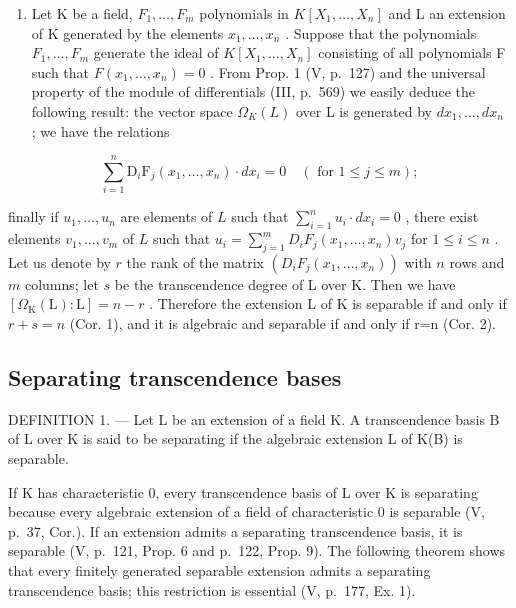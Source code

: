\begin{enumerate}
\def\labelenumi{\arabic{enumi})}
\setcounter{enumi}{1}
\tightlist
\item
  Let K be a field, \(F_{1}, \ldots, F_{m}\) polynomials in \(K[X_{1}, \ldots, X_{n}]\) and L an extension of K generated by the elements \(x_{1}, \ldots, x_{n}\) . Suppose that the polynomials \(F_{1}, \ldots, F_{m}\) generate the ideal of \(K[X_{1}, \ldots, X_{n}]\) consisting of all polynomials F such that \(F(x_{1}, \ldots, x_{n}) = 0\) . From Prop. 1 (V, p.~127) and the universal property of the module of differentials (III, p.~569) we easily deduce the following result: the vector space \(\Omega_{K}(L)\) over L is generated by \(dx_{1}, \ldots, dx_{n}\) ; we have the relations
\end{enumerate}

\[
\sum_ {i = 1} ^ {n} \mathrm{D} _ {i} \mathrm{F} _ {j} (x _ {1}, \dots , x _ {n}) \cdot d x _ {i} = 0 \quad (\text { for } 1 \leqslant j \leqslant m);\tag{6}
\]

finally if \(u_1, \ldots, u_n\) are elements of \(L\) such that \(\sum_{i=1}^{n} u_i \cdot dx_i = 0\) , there exist elements \(v_1, \ldots, v_m\) of \(L\) such that \(u_i = \sum_{j=1}^{m} D_i F_j(x_1, \ldots, x_n) v_j\) for \(1 \leqslant i \leqslant n\) . Let us denote by \(r\) the rank of the matrix \((D_i F_j(x_1, \ldots, x_n))\) with \(n\) rows and \(m\) columns; let \(s\) be the transcendence degree of L over K. Then we have \([\Omega_{\mathrm{K}}(\mathrm{L}):\mathrm{L}]=n-r\) . Therefore the extension L of K is separable if and only if \(r+s=n\) (Cor. 1), and it is algebraic and separable if and only if r=n (Cor. 2).

\subsection{Separating transcendence bases}

DEFINITION 1. --- Let L be an extension of a field K. A transcendence basis B of L over K is said to be separating if the algebraic extension L of K(B) is separable.

If K has characteristic 0, every transcendence basis of L over K is separating because every algebraic extension of a field of characteristic 0 is separable (V, p.~37, Cor.). If an extension admits a separating transcendence basis, it is separable (V, p.~121, Prop. 6 and p.~122, Prop. 9). The following theorem shows that every finitely generated separable extension admits a separating transcendence basis; this restriction is essential (V, p.~177, Ex. 1).

